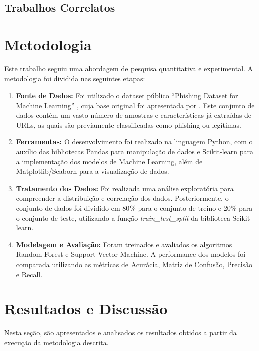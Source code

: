 \documentclass[12pt]{article}
\begin{document}
\subsection{Trabalhos Correlatos}


\section{Metodologia}
\label{sec:metodologia}
Este trabalho seguiu uma abordagem de pesquisa quantitativa e experimental. A metodologia foi dividida nas seguintes etapas:

\begin{enumerate}
    \item \textbf{Fonte de Dados:} Foi utilizado o dataset público ``Phishing Dataset for Machine Learning'' \parencite{kaggle_dataset_2022}, cuja base original foi apresentada por \textcite{mandadi2022}. Este conjunto de dados contém um vasto número de amostras e características já extraídas de URLs, as quais são previamente classificadas como phishing ou legítimas.

    \item \textbf{Ferramentas:} O desenvolvimento foi realizado na linguagem Python, com o auxílio das bibliotecas Pandas para manipulação de dados e Scikit-learn \parencite{scikit-learn} para a implementação dos modelos de Machine Learning, além de Matplotlib/Seaborn para a visualização de dados.

    \item \textbf{Tratamento dos Dados:} Foi realizada uma análise exploratória para compreender a distribuição e correlação dos dados. Posteriormente, o conjunto de dados foi dividido em 80\% para o conjunto de treino e 20\% para o conjunto de teste, utilizando a função \textit{train\_test\_split} da biblioteca Scikit-learn.

    \item \textbf{Modelagem e Avaliação:} Foram treinados e avaliados os algoritmos Random Forest e Support Vector Machine. A performance dos modelos foi comparada utilizando as métricas de Acurácia, Matriz de Confusão, Precisão e Recall.
\end{enumerate}


\section{Resultados e Discussão}
\label{sec:resultados}
Nesta seção, são apresentados e analisados os resultados obtidos a partir da execução da metodologia descrita.
\end{document}
